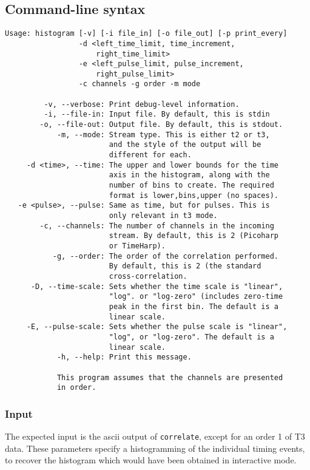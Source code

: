 \documentclass{article}
\newcommand{\correlate}{\texttt{correlate}}
\begin{document}
\subsection{Command-line syntax}
\begin{verbatim}
Usage: histogram [-v] [-i file_in] [-o file_out] [-p print_every]
                 -d <left_time_limit, time_increment, 
                     right_time_limit> 
                 -e <left_pulse_limit, pulse_increment, 
                     right_pulse_limit> 
                 -c channels -g order -m mode

         -v, --verbose: Print debug-level information.
         -i, --file-in: Input file. By default, this is stdin
        -o, --file-out: Output file. By default, this is stdout.
            -m, --mode: Stream type. This is either t2 or t3, 
                        and the style of the output will be 
                        different for each.
     -d <time>, --time: The upper and lower bounds for the time
                        axis in the histogram, along with the 
                        number of bins to create. The required 
                        format is lower,bins,upper (no spaces).
   -e <pulse>, --pulse: Same as time, but for pulses. This is 
                        only relevant in t3 mode.
        -c, --channels: The number of channels in the incoming
                        stream. By default, this is 2 (Picoharp
                        or TimeHarp).
           -g, --order: The order of the correlation performed.
                        By default, this is 2 (the standard 
                        cross-correlation.
      -D, --time-scale: Sets whether the time scale is "linear", 
                        "log". or "log-zero" (includes zero-time
                        peak in the first bin. The default is a
                        linear scale.
     -E, --pulse-scale: Sets whether the pulse scale is "linear", 
                        "log", or "log-zero". The default is a 
                        linear scale.
            -h, --help: Print this message.

            This program assumes that the channels are presented
            in order.
\end{verbatim}

\subsubsection{Input}
The expected input is the ascii output of \correlate, except for an order 1 of T3 data. These parameters specify a histogramming of the individual timing events, to recover the histogram which would have been obtained in interactive mode.
\end{document}
